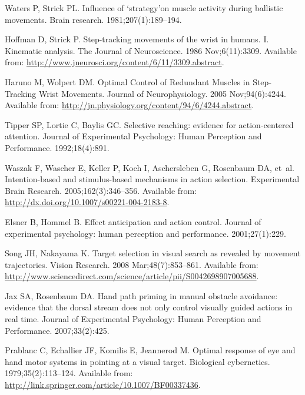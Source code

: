 \documentclass[10pt,letterpaper]{article}
\begin{document}
\begin{thebibliography}{10}
Waters P, Strick PL.
\newblock Influence of ‘strategy’on muscle activity during ballistic
  movements.
\newblock Brain research. 1981;207(1):189--194.

Hoffman D, Strick P.
\newblock Step-tracking movements of the wrist in humans. {I}. {Kinematic}
  analysis.
\newblock The Journal of Neuroscience. 1986 Nov;6(11):3309.
\newblock Available from:
  \url{http://www.jneurosci.org/content/6/11/3309.abstract}.

Haruno M, Wolpert DM.
\newblock Optimal {Control} of {Redundant} {Muscles} in {Step}-{Tracking}
  {Wrist} {Movements}.
\newblock Journal of Neurophysiology. 2005 Nov;94(6):4244.
\newblock Available from:
  \url{http://jn.physiology.org/content/94/6/4244.abstract}.

Tipper SP, Lortie C, Baylis GC.
\newblock Selective reaching: evidence for action-centered attention.
\newblock Journal of Experimental Psychology: Human Perception and Performance.
  1992;18(4):891.

Waszak F, Wascher E, Keller P, Koch I, Aschersleben G, Rosenbaum DA, et~al.
\newblock Intention-based and stimulus-based mechanisms in action selection.
\newblock Experimental Brain Research. 2005;162(3):346--356.
\newblock Available from: \url{http://dx.doi.org/10.1007/s00221-004-2183-8}.

Elsner B, Hommel B.
\newblock Effect anticipation and action control.
\newblock Journal of experimental psychology: human perception and performance.
  2001;27(1):229.

Song JH, Nakayama K.
\newblock Target selection in visual search as revealed by movement
  trajectories.
\newblock Vision Research. 2008 Mar;48(7):853--861.
\newblock Available from:
  \url{http://www.sciencedirect.com/science/article/pii/S0042698907005688}.

Jax SA, Rosenbaum DA.
\newblock Hand path priming in manual obstacle avoidance: evidence that the
  dorsal stream does not only control visually guided actions in real time.
\newblock Journal of Experimental Psychology: Human Perception and Performance.
  2007;33(2):425.

Prablanc C, Echallier JF, Komilis E, Jeannerod M.
\newblock Optimal response of eye and hand motor systems in pointing at a
  visual target.
\newblock Biological cybernetics. 1979;35(2):113--124.
\newblock Available from:
  \url{http://link.springer.com/article/10.1007/BF00337436}.


\end{thebibliography}
\end{document}
